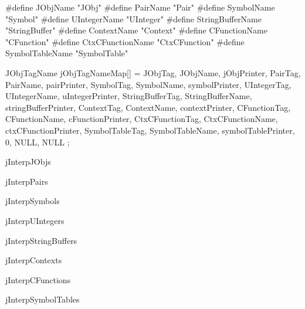 #define JObjName          "JObj"
#define PairName          "Pair"
#define SymbolName        "Symbol"
#define UIntegerName      "UInteger"
#define StringBufferName  "StringBuffer"
#define ContextName       "Context"
#define CFunctionName     "CFunction"
#define CtxCFunctionName  "CtxCFunction"
#define SymbolTableName   "SymbolTable"
\stopCHeader

\startCCode
JObjTagName jObjTagNameMap[] = {
  {JObjTag,         JObjName,         jObjPrinter},
  {PairTag,         PairName,         pairPrinter},
  {SymbolTag,       SymbolName,       symbolPrinter},
  {UIntegerTag,     UIntegerName,     uIntegerPrinter},
  {StringBufferTag, StringBufferName, stringBufferPrinter},
  {ContextTag,      ContextName,      contextPrinter},
  {CFunctionTag,    CFunctionName,    cFunctionPrinter},
  {CtxCFunctionTag, CtxCFunctionName, ctxCFunctionPrinter},
  {SymbolTableTag,  SymbolTableName,  symbolTablePrinter},
  {0,               NULL,             NULL}
};
\stopCCode

\diSimpComponent jInterpJObjs

\diSimpComponent jInterpPairs

\diSimpComponent jInterpSymbols

\diSimpComponent jInterpUIntegers

\diSimpComponent jInterpStringBuffers

\diSimpComponent jInterpContexts

\diSimpComponent jInterpCFunctions

\diSimpComponent jInterpSymbolTables
